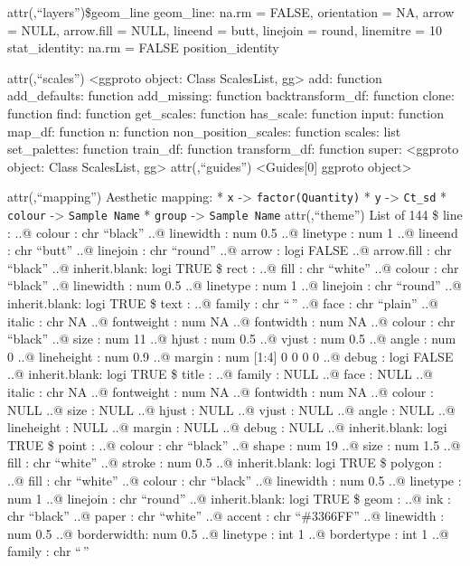 \documentclass[
]{article}
\begin{document}
attr(,``layers'')\$geom\_line geom\_line: na.rm = FALSE, orientation =
NA, arrow = NULL, arrow.fill = NULL, lineend = butt, linejoin = round,
linemitre = 10 stat\_identity: na.rm = FALSE position\_identity

attr(,``scales'') \textless ggproto object: Class ScalesList,
gg\textgreater{} add: function add\_defaults: function add\_missing:
function backtransform\_df: function clone: function find: function
get\_scales: function has\_scale: function input: function map\_df:
function n: function non\_position\_scales: function scales: list
set\_palettes: function train\_df: function transform\_df: function
super: \textless ggproto object: Class ScalesList, gg\textgreater{}
attr(,``guides'') \textless Guides{[}0{]} ggproto object\textgreater{}

attr(,``mapping'') Aesthetic mapping: * \texttt{x} -\textgreater{}
\texttt{factor(Quantity)} * \texttt{y} -\textgreater{} \texttt{Ct\_sd} *
\texttt{colour} -\textgreater{} \texttt{Sample\ Name} * \texttt{group}
-\textgreater{} \texttt{Sample\ Name} attr(,``theme'') List of 144 \$
line : ..@ colour : chr ``black'' ..@ linewidth : num 0.5 ..@ linetype :
num 1 ..@ lineend : chr ``butt'' ..@ linejoin : chr ``round'' ..@ arrow
: logi FALSE ..@ arrow.fill : chr ``black'' ..@ inherit.blank: logi TRUE
\$ rect : ..@ fill : chr ``white'' ..@ colour : chr ``black'' ..@
linewidth : num 0.5 ..@ linetype : num 1 ..@ linejoin : chr ``round''
..@ inherit.blank: logi TRUE \$ text : ..@ family : chr ``\,'' ..@ face
: chr ``plain'' ..@ italic : chr NA ..@ fontweight : num NA ..@
fontwidth : num NA ..@ colour : chr ``black'' ..@ size : num 11 ..@
hjust : num 0.5 ..@ vjust : num 0.5 ..@ angle : num 0 ..@ lineheight :
num 0.9 ..@ margin : num {[}1:4{]} 0 0 0 0 ..@ debug : logi FALSE ..@
inherit.blank: logi TRUE \$ title : ..@ family : NULL ..@ face : NULL
..@ italic : chr NA ..@ fontweight : num NA ..@ fontwidth : num NA ..@
colour : NULL ..@ size : NULL ..@ hjust : NULL ..@ vjust : NULL ..@
angle : NULL ..@ lineheight : NULL ..@ margin : NULL ..@ debug : NULL
..@ inherit.blank: logi TRUE \$ point : ..@ colour : chr ``black'' ..@
shape : num 19 ..@ size : num 1.5 ..@ fill : chr ``white'' ..@ stroke :
num 0.5 ..@ inherit.blank: logi TRUE \$ polygon : ..@ fill : chr
``white'' ..@ colour : chr ``black'' ..@ linewidth : num 0.5 ..@
linetype : num 1 ..@ linejoin : chr ``round'' ..@ inherit.blank: logi
TRUE \$ geom : ..@ ink : chr ``black'' ..@ paper : chr ``white'' ..@
accent : chr ``\#3366FF'' ..@ linewidth : num 0.5 ..@ borderwidth: num
0.5 ..@ linetype : int 1 ..@ bordertype : int 1 ..@ family : chr ``\,''
\end{document}
